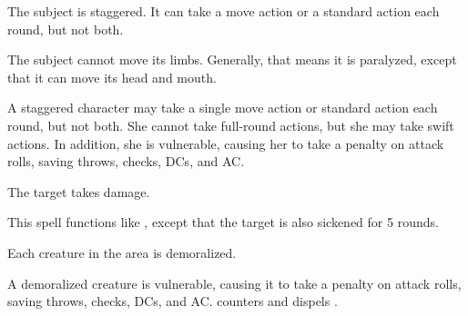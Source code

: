 \spellrng{\rngmed}
\spelldur{\durshort}
\begin{spellhealthy}
  The subject is staggered. It can take a move action or a standard action each round, but not both. 
\end{spellhealthy}
\begin{spellblood}
  The subject cannot move its limbs. Generally, that means it is paralyzed, except that it can move its head and mouth.
\end{spellblood}
\begin{spellnotes}
 A staggered character may take a single move action or standard action each round, but not both. She cannot take full-round actions, but she may take swift actions. In addition, she is vulnerable, causing her to take a  penalty on attack rolls, saving throws, checks, DCs, and AC.
\end{spellnotes}

\spellrng{\rngmed}
\begin{spelleffect}
  The target takes damage.
\end{spelleffect}

\begin{spelleffect}
  This spell functions like , except that the target is also sickened for 5 rounds.
\end{spelleffect}

\spelldur{\durmed}
\begin{spelleffect}
  Each creature in the area is demoralized.
\end{spelleffect}
\begin{spellnotes}
  A demoralized creature is vulnerable, causing it to take a  penalty on attack rolls, saving throws, checks, DCs, and AC.  counters and dispels .
\end{spellnotes}

